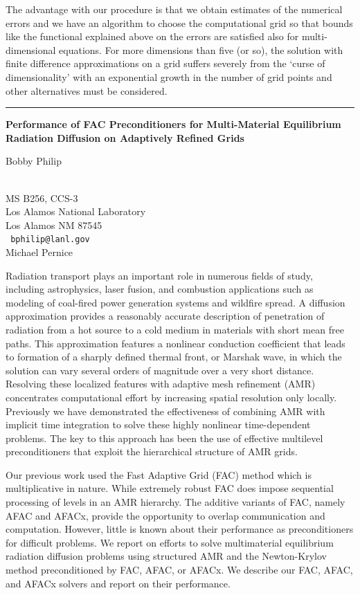 \documentclass[twosided]{report}
\begin{document}
The advantage with our procedure is that we obtain estimates of the
numerical errors and we have an algorithm to choose the computational
grid so that bounds like the functional explained above on the errors
are satisfied also for multi-dimensional equations. For more dimensions
than five (or so), the solution with finite difference approximations
on a grid suffers severely from the `curse of dimensionality' with an
exponential growth in the number of grid points and other alternatives
must be considered.


\begin{center} \rule{6in}{1pt} \end{center}
\newpage	%


\begin{center}
{\large			\label{philip}
{\bf
Performance of FAC Preconditioners for Multi-Material Equilibrium
Radiation Diffusion on Adaptively Refined Grids
}

Bobby Philip} \\
MS B256, CCS-3 \\
Los Alamos National Laboratory \\
Los Alamos NM 87545
\\ {\tt
bphilip@lanl.gov
}
\\
Michael Pernice
\end{center}

Radiation transport plays an important role in numerous fields of
study, including astrophysics, laser fusion, and combustion
applications such as modeling of coal-fired power generation systems
and wildfire spread. A diffusion approximation provides a reasonably
accurate description of penetration of radiation from a hot source to
a cold medium in materials with short mean free paths. This
approximation features a nonlinear conduction coefficient that leads
to formation of a sharply defined thermal front, or Marshak wave, in
which the solution can vary several orders of magnitude over a very
short distance. Resolving these localized features with adaptive mesh
refinement (AMR) concentrates computational effort by increasing
spatial resolution only locally. Previously we have demonstrated the
effectiveness of combining AMR with implicit time integration to solve
these highly nonlinear time-dependent problems. The key to this
approach has been the use of effective multilevel preconditioners that
exploit the hierarchical structure of AMR grids.

Our previous work used the Fast Adaptive Grid (FAC) method which is
multiplicative in nature. While extremely robust FAC does impose
sequential processing of levels in an AMR hierarchy. The additive
variants of FAC, namely AFAC and AFACx, provide the opportunity to
overlap communication and computation. However, little is known about
their performance as preconditioners for difficult problems. We report
on efforts to solve multimaterial equilibrium radiation diffusion
problems using structured AMR and the Newton-Krylov method
preconditioned by FAC, AFAC, or AFACx. We describe our FAC, AFAC, and
AFACx solvers and report on their performance.
\end{document}

